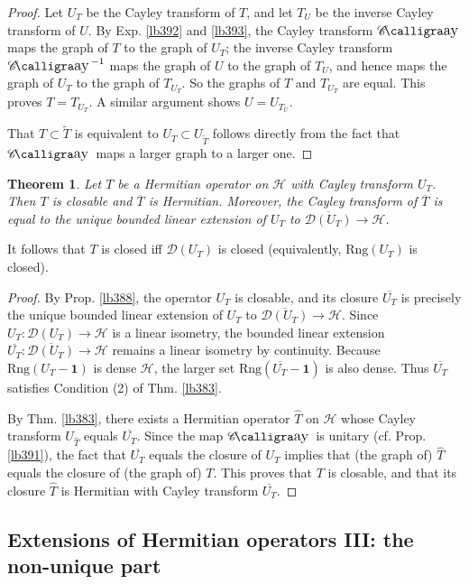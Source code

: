 \documentclass[12pt,b5paper,notitlepage]{article}
\theoremstyle{definition}
\theoremstyle{plain}
\newtheorem{thm}[df]{Theorem}
\DeclareMathOperator{\Cay}{\mathscr{C}\text{\kern -3pt {\calligra\large ay}}\,}
\newcommand{\wtd}{\widetilde}
\newcommand{\wht}{\widehat}
\newcommand{\ovl}{\overline}
\newcommand{\idt}{\mathbf{1}}
\newcommand{\Dom}{\mathscr{D}}
\newcommand{\Rng}{\mathrm{Rng}}
\newcommand{\MH}{\mathcal H}
\numberwithin{equation}{section}
\begin{document}
\begin{proof}
Let $U_T$ be the Cayley transform of $T$, and let $T_U$ be the inverse Cayley transform of $U$. By Exp. \ref{lb392} and \ref{lb393}, the Cayley transform $\Cay$ maps the graph of $T$ to the graph of $U_T$; the inverse Cayley transform $\Cay^{-1}$ maps the graph of $U$ to the graph of $T_U$, and hence maps the graph of $U_T$ to the graph of $T_{U_T}$. So the graphs of $T$ and $T_{U_T}$ are equal. This proves $T=T_{U_T}$. A similar argument shows $U=U_{T_U}$.

That $T\subset\wtd T$ is equivalent to $U_T\subset U_{\wtd T}$ follows directly from the fact that $\Cay$ maps a larger graph to a larger one.
\end{proof}





\begin{thm}\label{lb389}
Let $T$ be a Hermitian operator on $\MH$ with Cayley transform $U_T$. Then $T$ is closable and $\ovl T$ is Hermitian. Moreover, the Cayley transform of $\ovl T$ is equal to the unique bounded linear extension of $U_T$ to $\ovl{\Dom(U_T)}\rightarrow\MH$.
\end{thm}

It follows that $T$ is closed iff $\Dom(U_T)$ is closed (equivalently, $\Rng(U_T)$ is closed).


\begin{proof}
By Prop. \ref{lb388}, the operator $U_T$ is closable, and its closure $\ovl{U_T}$ is precisely the unique bounded linear extension of $U_T$ to $\ovl{\Dom(U_T)}\rightarrow\MH$. Since $U_T:\Dom(U_T)\rightarrow\MH$ is a linear isometry, the bounded linear extension $\ovl{U_T}:\ovl{\Dom(U_T)}\rightarrow\MH$ remains a linear isometry by continuity. Because $\Rng(U_T-\idt)$ is dense $\MH$, the larger set $\Rng(\ovl{U_T}-\idt)$ is also dense. Thus $\ovl{U_T}$ satisfies Condition (2) of Thm. \ref{lb383}. 

By Thm. \ref{lb383}, there exists a Hermitian operator $\wht T$ on $\MH$ whose Cayley transform $U_{\wht T}$ equals $\ovl{U_T}$. Since the map $\Cay$ is unitary (cf. Prop. \ref{lb391}), the fact that $\ovl{U_T}$ equals the closure of $U_T$ implies that (the graph of) $\wht T$ equals the closure of (the graph of) $T$. This proves that $T$ is closable, and that its closure $\wht T$ is Hermitian with Cayley transform $\ovl{U_T}$.
\end{proof}



\subsection{Extensions of Hermitian operators III: the non-unique part}
\end{document}
